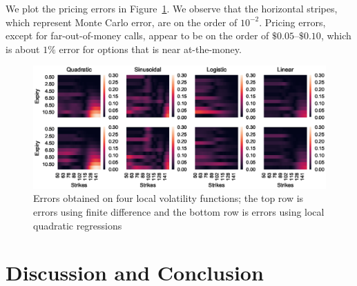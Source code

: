\documentclass[11pt]{article}
\numberwithin{equation}{section}
\begin{document}
We plot the pricing errors in Figure~\ref{fig:errors}. We observe that the
horizontal stripes, which represent Monte Carlo error, are on the order of
$10^{-2}$. Pricing errors, except for far-out-of-money calls, appear to be on
the order of $\$0.05$--$\$0.10$, which is about $1\%$ error for options that is
near at-the-money.

\begin{figure}[h!]
  \centering
  \includegraphics{figs/errors.eps}
  \caption{Errors obtained on four local volatility functions; the top row is
     errors using finite difference and the bottom row is errors using local
     quadratic regressions}
  \label{fig:errors}
\end{figure}


\section{Discussion and Conclusion}
\label{sec:conc}





\newpage

\appendix
\appendixpage







\end{document}

